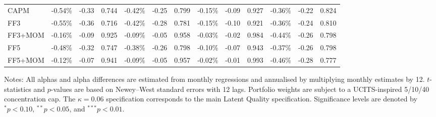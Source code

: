 \begin{table}[H]
\begin{threeparttable}
\begin{tabular*}{\textwidth}{@{\extracolsep{\fill}}lcccccccccccc}
\midrule
CAPM      & -0.54\% & -0.33 & 0.744 & -0.42\% & -0.25 & 0.799 & -0.15\% & -0.09 & 0.927 & -0.36\% & -0.22 & 0.824 \\
FF3       & -0.55\% & -0.36 & 0.716 & -0.42\% & -0.28 & 0.781 & -0.15\% & -0.10 & 0.921 & -0.36\% & -0.24 & 0.810 \\
FF3+MOM   & -0.16\% & -0.09 & 0.925 & -0.09\% & -0.05 & 0.958 & -0.03\% & -0.02 & 0.984 & -0.44\% & -0.26 & 0.798 \\
FF5       & -0.48\% & -0.32 & 0.747 & -0.38\% & -0.26 & 0.798 & -0.10\% & -0.07 & 0.943 & -0.37\% & -0.26 & 0.798 \\
FF5+MOM   & -0.12\% & -0.07 & 0.941 & -0.09\% & -0.05 & 0.957 & -0.02\% & -0.01 & 0.993 & -0.46\% & -0.28 & 0.777 \\
\bottomrule
\end{tabular*}
\begin{tablenotes}[flushleft]
\footnotesize
\item Notes: All alphas and alpha differences are estimated from monthly regressions and annualised by multiplying monthly estimates by 12. $t$-statistics and $p$-values are based on Newey--West standard errors with 12 lags. Portfolio weights are subject to a UCITS-inspired 5/10/40 concentration cap. The $\kappa=0.06$ specification corresponds to the main Latent Quality specification. Significance levels are denoted by $^{*} p<0.10$, $^{**} p<0.05$, and $^{***} p<0.01$.
\end{tablenotes}
\end{threeparttable}
\end{table}
